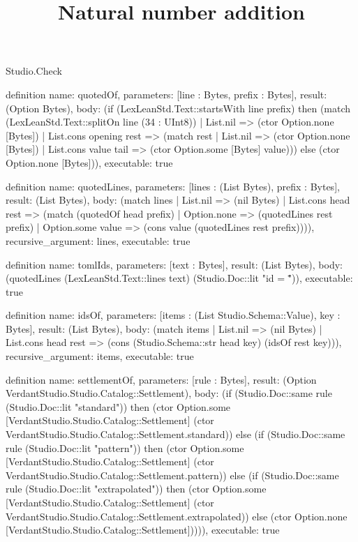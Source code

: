 \begin{lexlean}{Studio.Check}
\title{Natural number addition}
\begin{semanticmodule}
definition{
  name: quotedOf,
  parameters: [line : Bytes, prefix : Bytes],
  result: (Option Bytes),
  body: (if (LexLeanStd.Text::startsWith line prefix) then (match (LexLeanStd.Text::splitOn line (34 : UInt8))
    | List.nil => (ctor Option.none [Bytes])
    | List.cons opening rest => (match rest
      | List.nil => (ctor Option.none [Bytes])
      | List.cons value tail => (ctor Option.some [Bytes] value))) else (ctor Option.none [Bytes])),
  executable: true
}

definition{
  name: quotedLines,
  parameters: [lines : (List Bytes), prefix : Bytes],
  result: (List Bytes),
  body: (match lines
    | List.nil => (nil Bytes)
    | List.cons head rest => (match (quotedOf head prefix)
      | Option.none => (quotedLines rest prefix)
      | Option.some value => (cons value (quotedLines rest prefix)))),
  recursive_argument: lines,
  executable: true
}

definition{
  name: tomlIds,
  parameters: [text : Bytes],
  result: (List Bytes),
  body: (quotedLines (LexLeanStd.Text::lines text) (Studio.Doc::lit "id = \"")),
  executable: true
}

definition{
  name: idsOf,
  parameters: [items : (List Studio.Schema::Value), key : Bytes],
  result: (List Bytes),
  body: (match items
    | List.nil => (nil Bytes)
    | List.cons head rest => (cons (Studio.Schema::str head key) (idsOf rest key))),
  recursive_argument: items,
  executable: true
}

definition{
  name: settlementOf,
  parameters: [rule : Bytes],
  result: (Option VerdantStudio.Studio.Catalog::Settlement),
  body: (if (Studio.Doc::same rule (Studio.Doc::lit "standard")) then (ctor Option.some [VerdantStudio.Studio.Catalog::Settlement] (ctor VerdantStudio.Studio.Catalog::Settlement.standard)) else (if (Studio.Doc::same rule (Studio.Doc::lit "pattern")) then (ctor Option.some [VerdantStudio.Studio.Catalog::Settlement] (ctor VerdantStudio.Studio.Catalog::Settlement.pattern)) else (if (Studio.Doc::same rule (Studio.Doc::lit "extrapolated")) then (ctor Option.some [VerdantStudio.Studio.Catalog::Settlement] (ctor VerdantStudio.Studio.Catalog::Settlement.extrapolated)) else (ctor Option.none [VerdantStudio.Studio.Catalog::Settlement])))),
  executable: true
}


\end{semanticmodule}
\end{lexlean}
